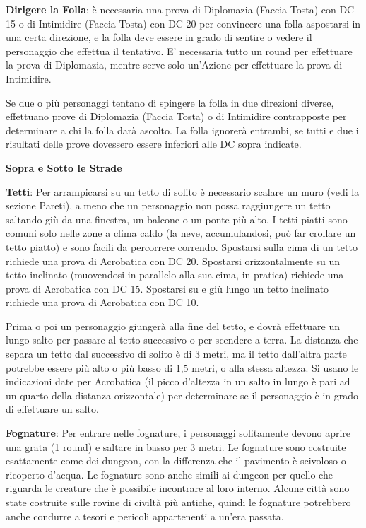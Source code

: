 \documentclass[a4paper,11pt,twoside,openany]{book}
\begin{document}
\textbf{Dirigere la Folla}: è necessaria una prova di Diplomazia (Faccia Tosta) con DC 15 o di Intimidire (Faccia Tosta) con DC 20 per convincere una folla aspostarsi in una certa direzione, e la folla deve essere in grado di sentire o vedere il personaggio che effettua il tentativo. E' necessaria tutto un round per effettuare la prova di Diplomazia, mentre serve solo un'Azione per effettuare la prova di Intimidire.

Se due o più personaggi tentano di spingere la folla in due direzioni diverse, effettuano prove di Diplomazia (Faccia Tosta) o di Intimidire contrapposte per determinare a chi la folla darà ascolto. La folla ignorerà entrambi, se tutti e due i risultati delle prove dovessero essere inferiori alle DC sopra indicate.

\textbf{Sopra e Sotto le Strade}

\textbf{Tetti}: Per arrampicarsi su un tetto di solito è necessario scalare un muro (vedi la sezione Pareti), a meno che un personaggio non possa raggiungere un tetto saltando giù da una finestra, un balcone o un ponte più alto. I tetti piatti sono comuni solo nelle zone a clima caldo (la neve, accumulandosi, può far crollare un tetto piatto) e sono facili da percorrere correndo. Spostarsi sulla cima di un tetto richiede una prova di Acrobatica con DC 20. Spostarsi orizzontalmente su un tetto inclinato (muovendosi in parallelo alla sua cima, in pratica) richiede una prova di Acrobatica con DC 15. Spostarsi su e giù lungo un tetto inclinato richiede una prova di Acrobatica con DC 10.

Prima o poi un personaggio giungerà alla fine del tetto, e dovrà effettuare un lungo salto per passare al tetto successivo o per scendere a terra. La distanza che separa un tetto dal successivo di solito è di 3 metri, ma il tetto dall'altra parte potrebbe essere più alto o più basso di 1,5 metri, o alla stessa altezza. Si usano le indicazioni date per Acrobatica (il picco d'altezza in un salto in lungo è pari ad un quarto della distanza orizzontale) per determinare se il personaggio è in grado di effettuare un salto.

\textbf{Fognature}: Per entrare nelle fognature, i personaggi solitamente devono aprire una grata (1 round) e saltare in basso per 3 metri. Le fognature sono costruite esattamente come dei dungeon, con la differenza che il pavimento è scivoloso o ricoperto d'acqua. Le fognature sono anche simili ai dungeon per quello che riguarda le creature che è possibile incontrare al loro interno. Alcune città sono state costruite sulle rovine di civiltà più antiche, quindi le fognature potrebbero anche condurre a tesori e pericoli appartenenti a un'era passata.
\end{document}
